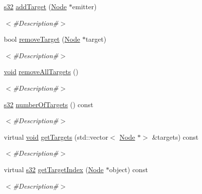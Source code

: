 \begin{DoxyCompactItemize}
\item 
\mbox{\hyperlink{_util_8h_aa62c75d314a0d1f37f79c4b73b2292e2}{s32}} \mbox{\hyperlink{classnjli_1_1_steering_behavior_aa197011275830165605ced9e47250b72}{add\+Target}} (\mbox{\hyperlink{classnjli_1_1_node}{Node}} $\ast$emitter)
\begin{DoxyCompactList}\small\item\em $<$\#\+Description\#$>$ \end{DoxyCompactList}\item 
bool \mbox{\hyperlink{classnjli_1_1_steering_behavior_a54b6a2a46d2918d0941475f0e75d84ab}{remove\+Target}} (\mbox{\hyperlink{classnjli_1_1_node}{Node}} $\ast$target)
\begin{DoxyCompactList}\small\item\em $<$\#\+Description\#$>$ \end{DoxyCompactList}\item 
\mbox{\hyperlink{_thread_8h_af1e856da2e658414cb2456cb6f7ebc66}{void}} \mbox{\hyperlink{classnjli_1_1_steering_behavior_a607058ee31eae853823c0ecd1cf5b81d}{remove\+All\+Targets}} ()
\begin{DoxyCompactList}\small\item\em $<$\#\+Description\#$>$ \end{DoxyCompactList}\item 
\mbox{\hyperlink{_util_8h_aa62c75d314a0d1f37f79c4b73b2292e2}{s32}} \mbox{\hyperlink{classnjli_1_1_steering_behavior_a068ffa3f1d80389b134c22955695f800}{number\+Of\+Targets}} () const
\begin{DoxyCompactList}\small\item\em $<$\#\+Description\#$>$ \end{DoxyCompactList}\item 
virtual \mbox{\hyperlink{_thread_8h_af1e856da2e658414cb2456cb6f7ebc66}{void}} \mbox{\hyperlink{classnjli_1_1_steering_behavior_acfac4925fbaa4c6e9a76efea3b015fa7}{get\+Targets}} (std\+::vector$<$ \mbox{\hyperlink{classnjli_1_1_node}{Node}} $\ast$$>$ \&targets) const
\begin{DoxyCompactList}\small\item\em $<$\#\+Description\#$>$ \end{DoxyCompactList}\item 
virtual \mbox{\hyperlink{_util_8h_aa62c75d314a0d1f37f79c4b73b2292e2}{s32}} \mbox{\hyperlink{classnjli_1_1_steering_behavior_aa8e882405b1cbeb62abeb154084dfccf}{get\+Target\+Index}} (\mbox{\hyperlink{classnjli_1_1_node}{Node}} $\ast$object) const
\begin{DoxyCompactList}\small\item\em $<$\#\+Description\#$>$ \end{DoxyCompactList}\item 
$$
\end{DoxyCompactItemize}
